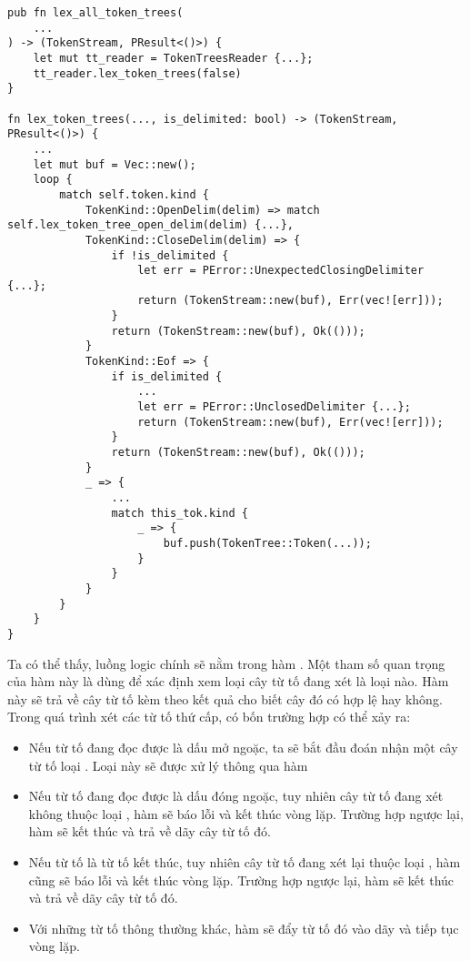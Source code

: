\noindent {}
\begin{lstlisting}[]
pub fn lex_all_token_trees(
    ...
) -> (TokenStream, PResult<()>) {
    let mut tt_reader = TokenTreesReader {...};
    tt_reader.lex_token_trees(false)
}

fn lex_token_trees(..., is_delimited: bool) -> (TokenStream, PResult<()>) {
    ...
    let mut buf = Vec::new();
    loop {
        match self.token.kind {
            TokenKind::OpenDelim(delim) => match self.lex_token_tree_open_delim(delim) {...},
            TokenKind::CloseDelim(delim) => {
                if !is_delimited {
                    let err = PError::UnexpectedClosingDelimiter {...};
                    return (TokenStream::new(buf), Err(vec![err]));
                }
                return (TokenStream::new(buf), Ok(()));
            }
            TokenKind::Eof => {
                if is_delimited {
                    ...
                    let err = PError::UnclosedDelimiter {...};
                    return (TokenStream::new(buf), Err(vec![err]));
                }
                return (TokenStream::new(buf), Ok(()));
            }
            _ => {
                ...
                match this_tok.kind {
                    _ => {
                        buf.push(TokenTree::Token(...));
                    }
                }
            }
        }
    }
}
\end{lstlisting}

    Ta có thể thấy, luồng logic chính sẽ nằm trong hàm . Một tham số quan trọng của hàm này là  dùng để xác định xem loại cây từ tố đang xét là loại nào. Hàm này sẽ trả về cây từ tố kèm theo kết quả cho biết cây đó có hợp lệ hay không. Trong quá trình xét các từ tố thứ cấp, có bốn trường hợp có thể xảy ra:

\begin{itemize}
    \item Nếu từ tố đang đọc được là dấu mở ngoặc, ta sẽ bắt đầu đoán nhận một cây từ tố loại . Loại này sẽ được xử lý thông qua hàm 
    \item Nếu từ tố đang đọc được là dấu đóng ngoặc, tuy nhiên cây từ tố đang xét không thuộc loại , hàm sẽ báo lỗi và kết thúc vòng lặp. Trường hợp ngược lại, hàm sẽ kết thúc và trả về dãy cây từ tố đó.
    \item Nếu từ tố là từ tố kết thúc, tuy nhiên cây từ tố đang xét lại thuộc loại , hàm cũng sẽ báo lỗi và kết thúc vòng lặp. Trường hợp ngược lại, hàm sẽ kết thúc và trả về dãy cây từ tố đó.
    \item Với những từ tố thông thường khác, hàm sẽ đẩy từ tố đó vào dãy và tiếp tục vòng lặp. 
\end{itemize}

